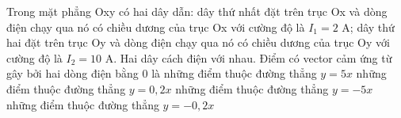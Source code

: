 \begin{vidu} %
Trong mặt phẳng Oxy có hai dây dẫn: dây thứ nhất đặt trên trục Ox và dòng điện chạy qua nó có chiều dương của trục Ox với cường độ là $I_1 = 2$ A; dây thứ hai đặt trên trục Oy và dòng điện chạy qua nó có chiều dương của trục Oy với cường độ là $I_2 = 10$ A. Hai dây cách điện với nhau. Điểm có vector cảm ứng từ gây bởi hai dòng điện bằng 0 là
\choice
{những điểm thuộc đường thẳng $y = 5x$}
{\True những điểm thuộc đường thẳng $y = 0,2x$}
{những điểm thuộc đường thẳng $y = - 5x$}
{những điểm thuộc đường thẳng $y = - 0,2x$}
\end{vidu}
